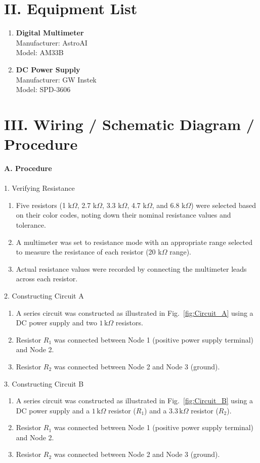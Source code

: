 \documentclass[12pt]{article}
\begin{document}
\section*{II. Equipment List}
\begin{enumerate}
    \item \textbf{Digital Multimeter} \\ 
          Manufacturer: AstroAI \\
          Model: AM33B
    \item \textbf{DC Power Supply} \\ 
          Manufacturer: GW Instek \\
          Model: SPD-3606
\end{enumerate}
\section*{III. Wiring / Schematic Diagram / Procedure}
\textbf{A. Procedure}\\\\
1. Verifying Resistance
\begin{enumerate}
    \item Five resistors (1 k$\Omega$, 2.7 k$\Omega$, 3.3 k$\Omega$, 4.7 k$\Omega$, and 6.8 k$\Omega$) were selected based on their color codes, noting down their nominal resistance values and tolerance.
    \item A multimeter was set to resistance mode with an appropriate range selected to measure the resistance of each resistor (20 k$\Omega$ range). 
    \item Actual resistance values were recorded by connecting the multimeter leads across each resistor.
\end{enumerate}
2. Constructing Circuit A
\begin{enumerate}
    \item A series circuit was constructed as illustrated in Fig.~\ref{fig:Circuit_A} using a DC power supply and two $1\,\text{k}\Omega$ resistors.
    \item Resistor $R_1$ was connected between Node 1 (positive power supply terminal) and Node 2.
    \item Resistor $R_2$ was connected between Node 2 and Node 3 (ground).
\end{enumerate}
3. Constructing Circuit B
\begin{enumerate}
    \item A series circuit was constructed as illustrated in Fig.~\ref{fig:Circuit_B} using a DC power supply and a $1\,\text{k}\Omega$ resistor ($R_1$) and a $3.3\,\text{k}\Omega$ resistor ($R_2$).
    \item Resistor $R_1$ was connected between Node 1 (positive power supply terminal) and Node 2.
    \item Resistor $R_2$ was connected between Node 2 and Node 3 (ground).
\end{enumerate}
\end{document}
